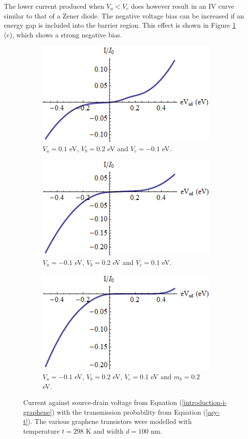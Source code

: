 		The lower current produced when $V_{a}<V_{c}$ does however result in an IV curve similar to that of a Zener diode. The negative voltage bias can be increased if an energy gap is included into the barrier region. This effect is shown in Figure \ref{asy-v-1} (c), which shows a strong negative bias.
		\begin{figure}[h]
			 \begin{subfigure}[h]{0.3\textwidth}
				\centerline{\includegraphics[scale=0.35]{images/asy-v-1}}
				\caption{$V_{a}=0.1$ eV, $V_{b}=0.2$ eV and $V_{c}=-0.1$ eV.}
			\end{subfigure}
			\hspace{0.5cm}
			\begin{subfigure}[h]{0.3\textwidth}
				\centerline{\includegraphics[scale=0.35]{images/asy-v-2}}
				\caption{$V_{a}=-0.1$ eV, $V_{b}=0.2$ eV and $V_{c}=0.1$ eV.}
			\end{subfigure}
			\hspace{0.5cm}
			\begin{subfigure}[h]{0.3\textwidth}
				\centerline{\includegraphics[scale=0.35]{images/asy-v-3}}
				\caption{$V_{a}=-0.1$ eV, $V_{b}=0.2$ eV, $V_{c}=0.1$ eV and $m_{b}=0.2$ eV.}
			\end{subfigure}
			\caption{Current against source-drain voltage from Equation (\ref{introduction-i-graphene}) with the transmission probability from Equation (\ref{asy-t}). The various graphene transistors were modelled with temperature $t=298$ K and width $d=100$ nm.}
			\label{asy-v-1}
		\end{figure}

